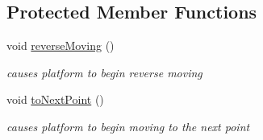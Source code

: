 \subsection*{Protected Member Functions}
\begin{DoxyCompactItemize}
\item 
\mbox{\label{class_platform_aae68e047eaa1046773ad62654c99421a}} 
void \hyperlink{class_platform_aae68e047eaa1046773ad62654c99421a}{reverse\+Moving} ()
\begin{DoxyCompactList}\small\item\em causes platform to begin reverse moving \end{DoxyCompactList}\item 
\mbox{\label{class_platform_a5462c5ec9fc865988ffccd2e0d67b2a9}} 
void \hyperlink{class_platform_a5462c5ec9fc865988ffccd2e0d67b2a9}{to\+Next\+Point} ()
\begin{DoxyCompactList}\small\item\em causes platform to begin moving to the next point \end{DoxyCompactList}\end{DoxyCompactItemize}
